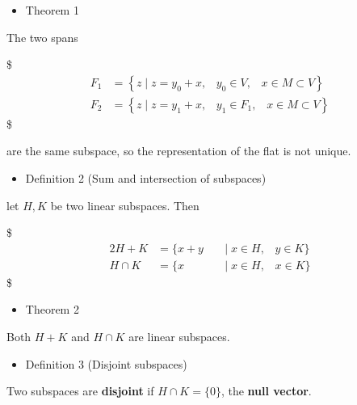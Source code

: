 \documentclass[
]{book}
\providecommand{\tightlist}{%
  \setlength{\itemsep}{0pt}\setlength{\parskip}{0pt}}
\begin{document}
{{{\begin{itemize}
\tightlist
\item
  Theorem 1
\end{itemize}

The two spans

\$
\begin{align}

F_1 &= \left\{ z \; \Big \vert  \; z=y_0 + x, \; \; \; y_0 \in V, \; \; \;  x \in M \subset V \right\}

\\

F_2 &= \left\{ z \; \Big \vert  \; z=y_1 + x, \; \; \; y_1 \in F_1, \; \; \;  x \in M \subset V \right\}


\end{align}
\$

are the same subspace, so the representation of the flat is not unique.

\begin{itemize}
\tightlist
\item
  Definition 2 (Sum and intersection of subspaces)
\end{itemize}

let \(H,K\) be two linear subspaces. Then

\$
\begin{alignat}{2}


H + K &= \Big\{ x+y \; &&\Big \vert  \; x \in H, \; \; \;  y \in K \Big\} \tag{sum of H and K}

\\

H \cap K &= \Big\{ x \; &&\Big \vert  \; x \in H, \; \; \;  x \in K \Big\} \tag{intersection of H and K}



\end{alignat}
\$

\begin{itemize}
\tightlist
\item
  Theorem 2
\end{itemize}

Both \(H + K\) and \(H \cap K\) are linear subspaces.

\begin{itemize}
\tightlist
\item
  Definition 3 (Disjoint subspaces)
\end{itemize}

Two subspaces are \textbf{disjoint} if \(H \cap K = \big \{ 0 \big \}\), the \textbf{null vector}.

}}}
\end{document}
